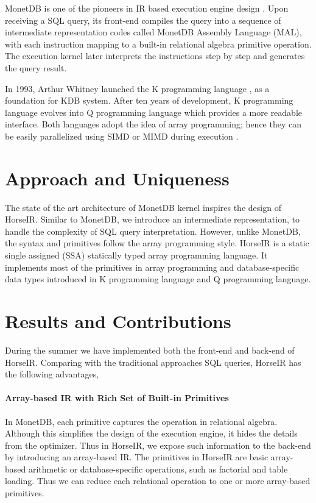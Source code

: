 \documentclass[sigplan]{acmart}
\begin{document}
MonetDB is one of the pioneers in IR based execution engine design
\cite{DBLP:journals/debu/IdreosGNMMK12}. Upon receiving a SQL query, its
front-end compiles the query into a sequence of intermediate representation
codes called MonetDB Assembly Language (MAL), with each instruction mapping to
a built-in relational algebra primitive operation. The execution kernel later
interprets the instructions step by step and generates the query result.

In 1993, Arthur Whitney launched the K programming language
\cite{KLangTutorial} , as a foundation for KDB system. After ten years of
development, K programming language evolves into Q programming language
\cite{QLangTutorial} which provides a more readable interface. Both languages
adopt the idea of array programming; hence they can be easily parallelized
using SIMD or MIMD during execution \cite{HowFastCanAPLBe}. 


\section{Approach and Uniqueness}

The state of the art architecture of MonetDB kernel inspires the design of
HorseIR. Similar to MonetDB, we introduce an intermediate representation, to
handle the complexity of SQL query interpretation.  However, unlike MonetDB,
the syntax and primitives follow the array programming style. HorseIR is a
static single assigned (SSA) statically typed array programming language. It
implements most of the primitives in array programming and database-specific
data types introduced in K programming language and Q programming language.

\section{Results and Contributions}

During the summer we have implemented both the front-end and back-end of
HorseIR. Comparing with the traditional approaches  SQL queries, HorseIR has
the following advantages,

\paragraph{Array-based IR with Rich Set of Built-in Primitives}
In MonetDB, each primitive captures the operation in relational algebra.
Although this simplifies the design of the execution engine, it hides the
details from the optimizer. Thus in HorseIR, we expose such information to the
back-end by introducing an array-based IR. The primitives in HorseIR are basic
array-based arithmetic or database-specific operations, such as factorial and
table loading. Thus we can reduce each relational operation to one or more
array-based primitives. 
\end{document}
